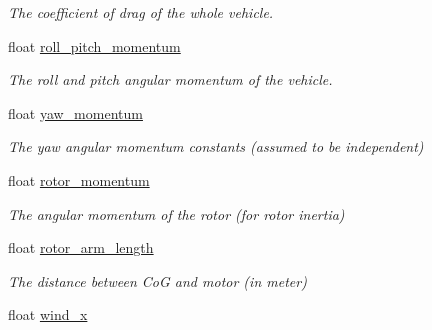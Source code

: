 \begin{DoxyCompactItemize}
\begin{DoxyCompactList}\small\item\em The coefficient of drag of the whole vehicle. \end{DoxyCompactList}\item 
\hypertarget{structsimulation__config__t_a666171a79a3d43e610d5be93335c186c}{float \hyperlink{structsimulation__config__t_a666171a79a3d43e610d5be93335c186c}{roll\+\_\+pitch\+\_\+momentum}}\label{structsimulation__config__t_a666171a79a3d43e610d5be93335c186c}

\begin{DoxyCompactList}\small\item\em The roll and pitch angular momentum of the vehicle. \end{DoxyCompactList}\item 
\hypertarget{structsimulation__config__t_a8d06cda5afaeff442594e751b2e4dab8}{float \hyperlink{structsimulation__config__t_a8d06cda5afaeff442594e751b2e4dab8}{yaw\+\_\+momentum}}\label{structsimulation__config__t_a8d06cda5afaeff442594e751b2e4dab8}

\begin{DoxyCompactList}\small\item\em The yaw angular momentum constants (assumed to be independent) \end{DoxyCompactList}\item 
\hypertarget{structsimulation__config__t_aea8763d6cedd90cc8324174d5323d62a}{float \hyperlink{structsimulation__config__t_aea8763d6cedd90cc8324174d5323d62a}{rotor\+\_\+momentum}}\label{structsimulation__config__t_aea8763d6cedd90cc8324174d5323d62a}

\begin{DoxyCompactList}\small\item\em The angular momentum of the rotor (for rotor inertia) \end{DoxyCompactList}\item 
\hypertarget{structsimulation__config__t_af70d0a2fe71c9ea252307a24095e8038}{float \hyperlink{structsimulation__config__t_af70d0a2fe71c9ea252307a24095e8038}{rotor\+\_\+arm\+\_\+length}}\label{structsimulation__config__t_af70d0a2fe71c9ea252307a24095e8038}

\begin{DoxyCompactList}\small\item\em The distance between Co\+G and motor (in meter) \end{DoxyCompactList}\item 
\hypertarget{structsimulation__config__t_a333dbbf8b88602f3d9aab584c5398a80}{float \hyperlink{structsimulation__config__t_a333dbbf8b88602f3d9aab584c5398a80}{wind\+\_\+x}}\label{structsimulation__config__t_a333dbbf8b88602f3d9aab584c5398a80}


\end{DoxyCompactItemize}
